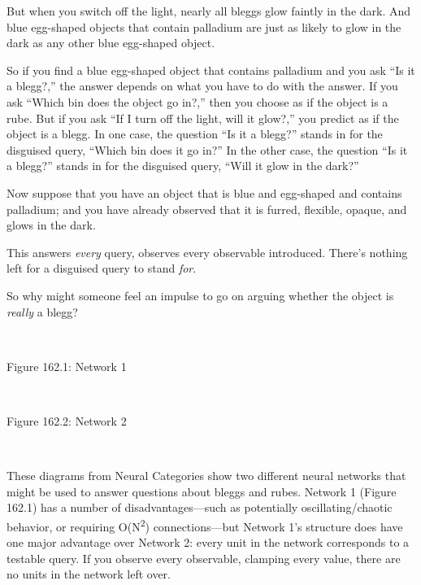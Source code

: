 {
 But when you switch off the light, nearly all bleggs glow faintly
in the dark. And blue egg-shaped objects that contain palladium are
just as likely to glow in the dark as any other blue egg-shaped
object.}

{
 So if you find a blue egg-shaped object that contains palladium
and you ask ``Is it a blegg?,'' the
answer depends on what you have to do with the answer. If you ask
``Which bin does the object go
in?,'' then you choose as if the object is a rube.
But if you ask ``If I turn off the light, will it
glow?,'' you predict as if the object is a blegg. In
one case, the question ``Is it a
blegg?'' stands in for the disguised query,
``Which bin does it go in?'' In the
other case, the question ``Is it a
blegg?'' stands in for the disguised query,
``Will it glow in the dark?''}

{
 Now suppose that you have an object that is blue and egg-shaped
and contains palladium; and you have already observed that it is
furred, flexible, opaque, and glows in the dark.}

{
 This answers \textit{every} query, observes every observable
introduced. There's nothing left for a disguised query
to stand \textit{for}.}

{
 So why might someone feel an impulse to go on arguing whether the
object is \textit{really} a blegg?}

{
 ~}

{\centering
{}
 \newline
 Figure 162.1: Network 1
\par}


\bigskip

{
 ~}

{\centering
{}
 \newline
 Figure 162.2: Network 2
\par}


\bigskip

{
 ~}

{
 These diagrams from Neural Categories show two different neural
networks that might be used to answer questions about bleggs and rubes.
Network 1 (Figure 162.1) has a number of disadvantages---such as
potentially oscillating/chaotic behavior, or requiring
O(N\textsuperscript{2}) connections---but Network 1's
structure does have one major advantage over Network 2: every unit in
the network corresponds to a testable query. If you observe every
observable, clamping every value, there are no units in the network
left over.}

